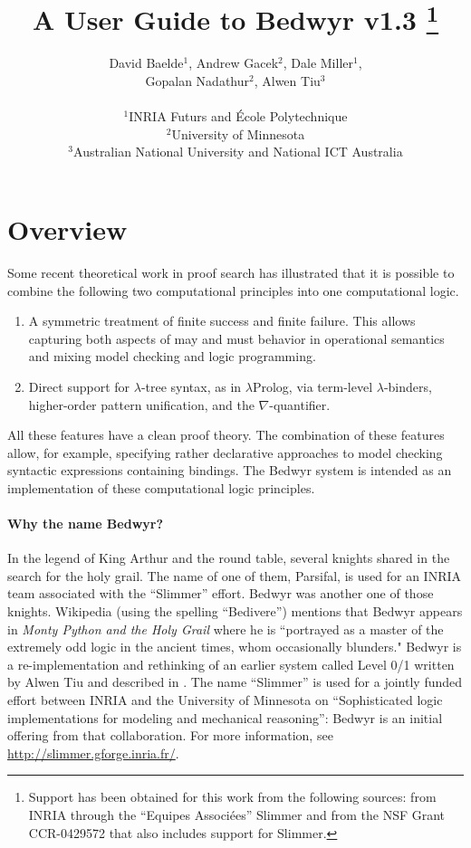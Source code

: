 \documentclass{article}
\title{{\Huge A User Guide to Bedwyr v1.3}
   \thanks{Support has been obtained for this work from the following
           sources: from INRIA through the ``Equipes Associ{\'e}es''
           Slimmer and from the NSF Grant CCR-0429572 that also
           includes support for Slimmer.}
}
\author{David Baelde$^1$, Andrew Gacek$^2$, Dale Miller$^1$, \\
        Gopalan Nadathur$^2$, Alwen Tiu$^3$  \\ \\
$^1$INRIA Futurs and \'Ecole Polytechnique\\
$^2$University of Minnesota\\
$^3$Australian National University and National ICT Australia
}
\begin{document}
\maketitle

\section{Overview}

Some recent theoretical work in proof search has illustrated that it
is possible to combine the following two computational principles into
one computational logic.
\begin{enumerate}
\item A symmetric treatment of finite success and finite failure.
  This allows capturing both aspects of may and must behavior in
  operational semantics and mixing model checking and logic programming.

\item Direct support for $\lambda$-tree syntax, as in $\lambda$Prolog,
       via term-level $\lambda$-binders, higher-order pattern
       unification, and the $\nabla$-quantifier.
\end{enumerate}
All these features have a clean proof theory.  The combination of
these features allow, for example, specifying rather declarative
approaches to model checking syntactic expressions containing
bindings.  The Bedwyr system is intended as an implementation of these
computational logic principles.


\paragraph{Why the name Bedwyr?}
In the legend of King Arthur and the round table, several knights
shared in the search for the holy grail.  The name of one of them,
Parsifal, is used for an INRIA team associated with the ``Slimmer''
effort.  Bedwyr was another one of those knights.  Wikipedia (using
the spelling ``Bedivere'') mentions that Bedwyr appears in {\em Monty
Python and the Holy Grail} where he is ``portrayed as a master of the
extremely odd logic in the ancient times, whom occasionally blunders."
Bedwyr is a re-implementation and rethinking of an earlier system
called Level 0/1 written by Alwen Tiu and described in
\cite{tiu05eshol}. The name ``Slimmer'' is used for a jointly funded
effort between INRIA and the University of Minnesota on
``Sophisticated logic implementations for modeling and mechanical
reasoning'': Bedwyr is an initial offering from
that collaboration.
For more information, see
\url{http://slimmer.gforge.inria.fr/}.
\end{document}
